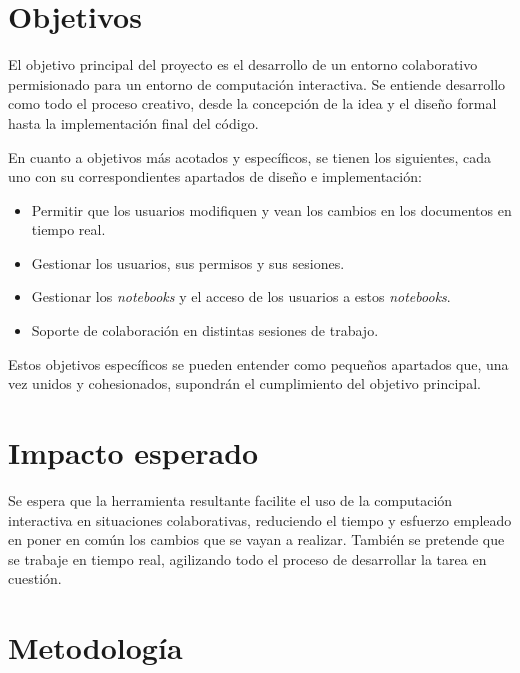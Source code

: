 \documentclass[11pt,spanish,listoffigures]{tfgetsinf}
\begin{document}

\section{Objetivos}
\label{sec:objetivos}

El objetivo principal del proyecto es el desarrollo de un entorno colaborativo permisionado para un entorno de computación interactiva. Se entiende desarrollo como todo el proceso creativo, desde la concepción de la idea y el diseño formal hasta la implementación final del código.

En cuanto a objetivos más acotados y específicos, se tienen los siguientes, cada uno con su correspondientes apartados de diseño e implementación:

\begin{itemize}

\item Permitir que los usuarios modifiquen y vean los cambios en los documentos en tiempo real.

\item Gestionar los usuarios, sus permisos y sus sesiones.

\item Gestionar los \textit{notebooks} y el acceso de los usuarios a estos \textit{notebooks}.

\item Soporte de colaboración en distintas sesiones de trabajo.

\end{itemize}

Estos objetivos específicos se pueden entender como pequeños apartados que, una vez unidos y cohesionados, supondrán el cumplimiento del objetivo principal.



\section{Impacto esperado}
\label{sec:impacto}

Se espera que la herramienta resultante facilite el uso de la computación interactiva en situaciones colaborativas, reduciendo el tiempo y esfuerzo empleado en poner en común los cambios que se vayan a realizar. También se pretende que se trabaje en tiempo real, agilizando todo el proceso de desarrollar la tarea en cuestión. 



\section{Metodología}
\label{sec:metodologia}
\end{document}
